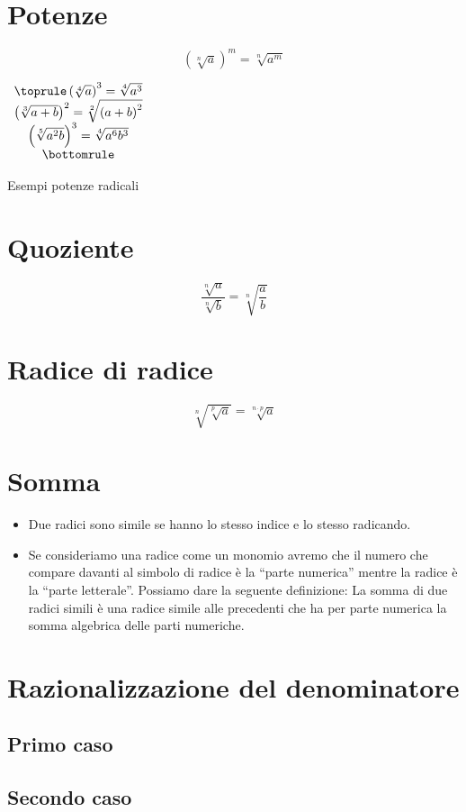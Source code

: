 \section{Potenze}
\label{sec:PotenzeRadici}
\[\left( \sqrt[n]{a}\right)^m=\sqrt[n]{a^m}\]
\begin{table}[H]
\centering
$
\begin{array}{cc}
\toprule
\left( \sqrt[4]{a}\right)^3=\sqrt[4]{a^3} \\ 
\left( \sqrt[3]{a+b}\right)^2=\sqrt[2]{\left( a+b\right)^2 } \\ 
\left( \sqrt[5]{a^2b}\right)^3=\sqrt[4]{a^6b^3} \\ 
\bottomrule 
\end{array}
$ 
\label{tab:potenzeradici1}
\caption{Esempi potenze radicali}
\end{table}
\section{Quoziente} 
\label{sec:quozienteradicali}
\[\dfrac{\sqrt[n]{a}}{\sqrt[n]{b}}=\sqrt[n]{\dfrac{a}{b}}\]
\section{Radice di radice}
\label{sec:radicediradice}
\[\sqrt[n]{\sqrt[p]{a}}=\sqrt[n\cdot p]{a}\]
\section{Somma}
\label{sec:SommaReali}
\begin{itemize}
\item Due radici sono simile se hanno lo stesso indice e  lo stesso radicando.
\item Se consideriamo una radice come un monomio avremo che il numero che compare davanti al simbolo di radice è la "`parte numerica"' mentre la radice è la "`parte letterale"'. Possiamo dare la seguente definizione: La somma di due radici simili è una radice simile alle precedenti che ha per parte numerica la somma algebrica delle parti numeriche.
\end{itemize}
\section{Razionalizzazione del denominatore}
\label{sec:razzionalizzazionedenominatoreradici}
\subsection{Primo caso}
\label{sec:razionzinalizzadioneden1caso}
\subsection{Secondo caso}
\label{sec:razionzinalizzadioneden2caso}


